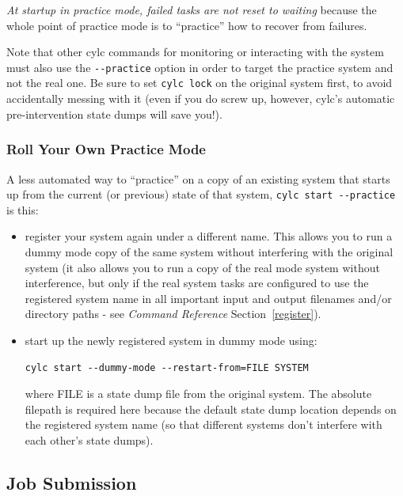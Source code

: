 \documentclass[11pt,a4paper]{article}
\begin{document}
{\em At startup in practice mode, failed tasks are not reset to waiting}
because the whole point of practice mode is to ``practice'' how to
recover from failures.

Note that other cylc commands for monitoring or interacting with the
system must also use the \lstinline=--practice= option in order to
target the practice system and not the real one. Be sure to set
\lstinline=cylc lock= on the original system first, to avoid
accidentally messing with it (even if you do screw up, however, cylc's
automatic pre-intervention state dumps will save you!).


\subsubsection{Roll Your Own Practice Mode}

A less automated way to ``practice'' on a copy of an existing system
that starts up from the current (or previous) state of that system, 
\lstinline=cylc start --practice= is this:

\begin{itemize}
    \item register your system again under a different name. This allows
        you to run a dummy mode copy of the same system without
        interfering with the original system (it also allows you to run
        a copy of the real mode system without interference, but only if
        the real system tasks are configured to use the registered
        system name in all important input and output filenames and/or
        directory paths - see {\em Command Reference} Section~\ref{register}).

    \item start up the newly registered system in dummy mode using:
        \begin{lstlisting}
cylc start --dummy-mode --restart-from=FILE SYSTEM
        \end{lstlisting}
        where FILE is a state dump file from the original system. The
        absolute filepath is required here because the default state
        dump location depends on the registered system name (so that
        different systems don't interfere with each other's state
        dumps).

\end{itemize}

\subsection{Job Submission}
\label{JobSubmission}
\end{document}
